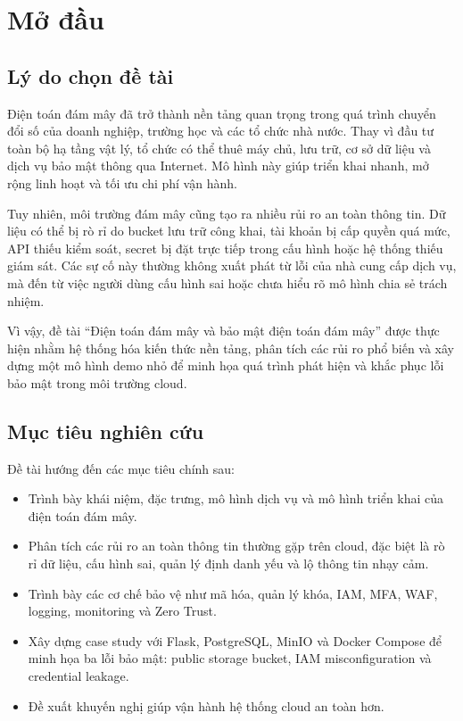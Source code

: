 \chapter{Mở đầu}

\section{Lý do chọn đề tài}
Điện toán đám mây đã trở thành nền tảng quan trọng trong quá trình chuyển đổi số của doanh nghiệp, trường học và các tổ chức nhà nước. Thay vì đầu tư toàn bộ hạ tầng vật lý, tổ chức có thể thuê máy chủ, lưu trữ, cơ sở dữ liệu và dịch vụ bảo mật thông qua Internet. Mô hình này giúp triển khai nhanh, mở rộng linh hoạt và tối ưu chi phí vận hành.

Tuy nhiên, môi trường đám mây cũng tạo ra nhiều rủi ro an toàn thông tin. Dữ liệu có thể bị rò rỉ do bucket lưu trữ công khai, tài khoản bị cấp quyền quá mức, API thiếu kiểm soát, secret bị đặt trực tiếp trong cấu hình hoặc hệ thống thiếu giám sát. Các sự cố này thường không xuất phát từ lỗi của nhà cung cấp dịch vụ, mà đến từ việc người dùng cấu hình sai hoặc chưa hiểu rõ mô hình chia sẻ trách nhiệm.

Vì vậy, đề tài ``Điện toán đám mây và bảo mật điện toán đám mây'' được thực hiện nhằm hệ thống hóa kiến thức nền tảng, phân tích các rủi ro phổ biến và xây dựng một mô hình demo nhỏ để minh họa quá trình phát hiện và khắc phục lỗi bảo mật trong môi trường cloud.

\section{Mục tiêu nghiên cứu}
Đề tài hướng đến các mục tiêu chính sau:
\begin{itemize}
    \item Trình bày khái niệm, đặc trưng, mô hình dịch vụ và mô hình triển khai của điện toán đám mây.
    \item Phân tích các rủi ro an toàn thông tin thường gặp trên cloud, đặc biệt là rò rỉ dữ liệu, cấu hình sai, quản lý định danh yếu và lộ thông tin nhạy cảm.
    \item Trình bày các cơ chế bảo vệ như mã hóa, quản lý khóa, IAM, MFA, WAF, logging, monitoring và Zero Trust.
    \item Xây dựng case study với Flask, PostgreSQL, MinIO và Docker Compose để minh họa ba lỗi bảo mật: public storage bucket, IAM misconfiguration và credential leakage.
    \item Đề xuất khuyến nghị giúp vận hành hệ thống cloud an toàn hơn.
\end{itemize}

